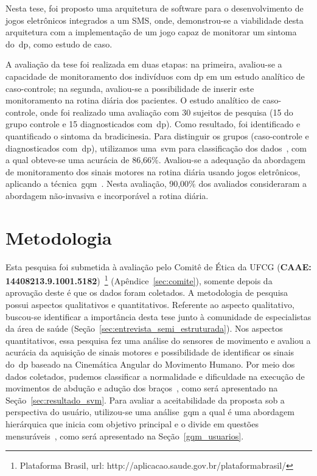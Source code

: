 Nesta tese, foi proposto uma arquitetura de software para o desenvolvimento de jogos eletrônicos integrados a um SMS, onde, demonstrou-se a viabilidade desta arquitetura com a implementação de um jogo capaz de monitorar um sintoma do~\ac{dp}, como estudo de caso.


A avaliação da tese foi realizada em duas etapas: na primeira, avaliou-se a capacidade de monitoramento dos indivíduos com \ac{dp} em um estudo analítico de caso-controle; na segunda, avaliou-se a possibilidade de inserir este monitoramento na rotina diária dos pacientes. O estudo analítico de caso-controle, onde foi realizado uma avaliação com 30 sujeitos de pesquisa (15 do grupo controle e 15 diagnosticados com~\ac{dp}). Como resultado, foi identificado e quantificado o sintoma da bradicinesia. Para distinguir os grupos (caso-controle e diagnosticados com~\ac{dp}), utilizamos uma~\ac{svm} para classificação dos dados~\cite{datamining2005}, com a qual obteve-se uma acurácia de 86,66\%. Avaliou-se a adequação da abordagem de monitoramento dos sinais motores na rotina diária usando jogos eletrônicos, aplicando a técnica~\ac{gqm}~\cite{van1999goal}. Nesta avaliação, 90,00\% dos avaliados consideraram a abordagem não-invasiva e incorporável a rotina diária. 

\section{Metodologia}
Esta pesquisa foi submetida à avaliação pelo Comitê de Ética da UFCG (\textbf{CAAE: 14408213.9.1001.5182})~\footnote{Plataforma Brasil, url: http://aplicacao.saude.gov.br/plataformabrasil/} (Apêndice~\ref{sec:comite}), somente depois da aprovação deste é que os dados foram coletados. A metodologia de pesquisa possui aspectos qualitativos e quantitativos. Referente ao aspecto qualitativo, buscou-se identificar a importância desta tese junto à comunidade de especialistas da área de saúde (Seção~\ref{sec:entrevista_semi_estruturada}). Nos aspectos quantitativos, essa pesquisa fez uma análise do sensores de movimento e avaliou a acurácia da aquisição de sinais motores e possibilidade de identificar os sinais do~\ac{dp} baseado na Cinemática Angular do Movimento Humano. Por meio dos dados coletados, pudemos classificar a normalidade e dificuldade na execução de movimentos de abdução e adução dos braços~\cite{mcginnis2013biomechanics}, como será apresentado na Seção~\ref{sec:resultado_svm}. Para avaliar a aceitabilidade da proposta sob a perspectiva do usuário, utilizou-se uma análise~\ac{gqm} a qual é uma abordagem hierárquica que inicia com objetivo principal e o divide em questões mensuráveis~\cite{saraiva2006}, como será apresentado na Seção~\ref{gqm_usuarios}.

